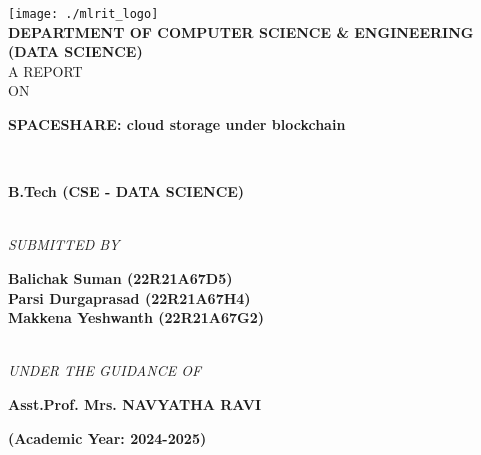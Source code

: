 \documentclass[a4paper, 12pt]{report}
\newenvironment{frontmatter}{}{}
\begin{document}
\begin{frontmatter}
\begin{titlepage}
\begin{center}
\vspace*{0.5cm}
\texttt{[image: ./mlrit\_logo]}\\[0.5cm]
\vspace*{1.0cm}
\textbf{\large DEPARTMENT OF COMPUTER SCIENCE \& ENGINEERING (DATA SCIENCE)}\\[1.2cm]
\textup{\large  A REPORT\\[0.4cm]ON}\\[0.4cm]
\begin{LARGE}
{\textbf {SPACESHARE: cloud storage under blockchain}}\end{LARGE}\\[0.7cm]
\begin{large}\textbf {B.Tech (CSE - DATA SCIENCE)}\end{large}\\[1.5cm]
\textit{SUBMITTED BY}\\[1.0cm]
\begin{large}
\textbf{Balichak Suman (22R21A67D5)}\\[0.1cm]
\textbf{Parsi Durgaprasad (22R21A67H4)}\\[0.1cm]
\textbf{Makkena Yeshwanth (22R21A67G2)}\\[0.1cm]
\end{large}
\\[1.4cm]
\textit{UNDER THE GUIDANCE OF}\\[.4cm]
\begin{large}\textbf{Asst.Prof. Mrs. NAVYATHA RAVI}\\[1.5cm]\end{large}
\textbf{(Academic Year: 2024-2025)}
\vfill
\end{center}
\end{titlepage}
\begin{titlepage}

\end{titlepage}
\end{frontmatter}
\end{document}
